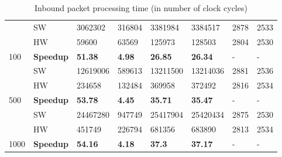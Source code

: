 \begin{table}[]
\begin{tabular}{llllllll}
      & SW    & 3062302   & 316804    & 3381984    & 3384517    & 2878       & 2533 \\
      & HW    & 59600     & 63569     & 125973  & 128503  & 2804       & 2530 \\
\multirow{-3}{*}{100}      & {\color[HTML]{00B050} \textbf{Speedup}}   & {\color[HTML]{00B050} \textbf{51.38}}   & {\color[HTML]{00B050} \textbf{4.98}} & {\color[HTML]{00B050} \textbf{26.85}} & {\color[HTML]{00B050} \textbf{26.34}} & -       & - \\
\midrule
      & SW    & 12619006     & 589613    & 13211500   & 13214036   & 2881       & 2536 \\
      & HW    & 234658    & 132484    & 369958  & 372492  & 2816       & 2534 \\
\multirow{-3}{*}{500}      & {\color[HTML]{00B050} \textbf{Speedup}}   & {\color[HTML]{00B050} \textbf{53.78}}   & {\color[HTML]{00B050} \textbf{4.45}} & {\color[HTML]{00B050} \textbf{35.71}} & {\color[HTML]{00B050} \textbf{35.47}} & -       & - \\
\midrule
      & SW    & 24467280     & 947749    & 25417904   & 25420434   & 2875       & 2530 \\
      & HW    & 451749    & 226794    & 681356  & 683890  & 2813       & 2534 \\
\multirow{-3}{*}{1000}     & {\color[HTML]{00B050} \textbf{Speedup}}   & {\color[HTML]{00B050} \textbf{54.16}}   & {\color[HTML]{00B050} \textbf{4.18}} & {\color[HTML]{00B050} \textbf{37.3}}  & {\color[HTML]{00B050} \textbf{37.17}} & -       & -     \\
\bottomrule
\end{tabular}
\caption{Inbound packet processing time (in number of clock cycles)}
\label{table:7.1}
\end{table}\\


